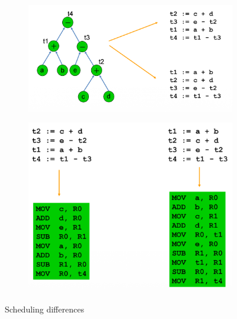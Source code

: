 \begin{figure}[h]
	\begin{center}
		\begin{subfigure}[b]{0.55\textwidth}
			\includegraphics[width=\textwidth]{images/Scheduling_1.png}
		\end{subfigure}
		\hfill
		\begin{subfigure}[b]{0.35\textwidth}
			\includegraphics[width=\textwidth]{images/Scheduling_2.png}
		\end{subfigure}
		\caption{Scheduling differences}
		\label{fig:scheduling}
	\end{center}
\end{figure}



 


